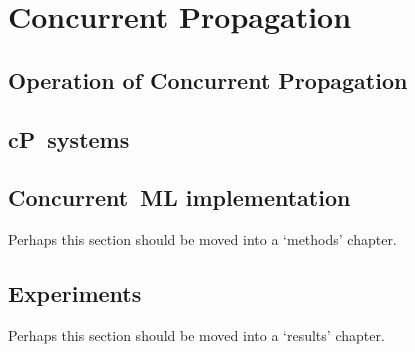 \chapter{Concurrent Propagation}

\section{Operation of Concurrent Propagation}

\section{cP~systems}

\section{Concurrent~ML implementation}

Perhaps this section should be moved into a `methods' chapter.

\section{Experiments}

Perhaps this section should be moved into a `results' chapter.